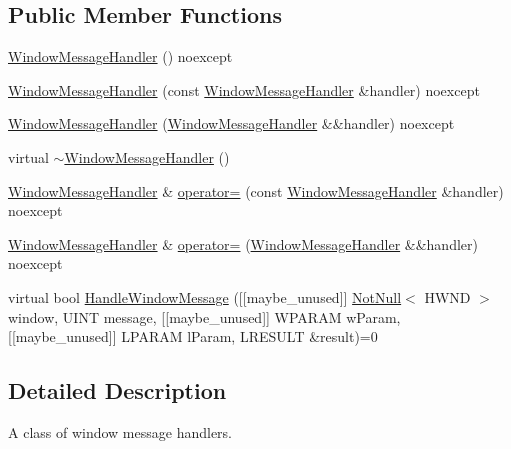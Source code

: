 \subsection*{Public Member Functions}
\begin{DoxyCompactItemize}
\item 
\hyperlink{classmage_1_1_window_message_handler_ae2213e3ff0a7c418ecfed87cfa43a8b7}{Window\+Message\+Handler} () noexcept
\item 
\hyperlink{classmage_1_1_window_message_handler_a2dd683eafde6c68efc55aebc8460fb0a}{Window\+Message\+Handler} (const \hyperlink{classmage_1_1_window_message_handler}{Window\+Message\+Handler} \&handler) noexcept
\item 
\hyperlink{classmage_1_1_window_message_handler_ab6fe3eac35ef7262941dae8e65841d88}{Window\+Message\+Handler} (\hyperlink{classmage_1_1_window_message_handler}{Window\+Message\+Handler} \&\&handler) noexcept
\item 
virtual \hyperlink{classmage_1_1_window_message_handler_a24eae1a24e783b22fce2c7fdd8e14fef}{$\sim$\+Window\+Message\+Handler} ()
\item 
\hyperlink{classmage_1_1_window_message_handler}{Window\+Message\+Handler} \& \hyperlink{classmage_1_1_window_message_handler_a6f48f6a94d62bee913e5f0fabc166cab}{operator=} (const \hyperlink{classmage_1_1_window_message_handler}{Window\+Message\+Handler} \&handler) noexcept
\item 
\hyperlink{classmage_1_1_window_message_handler}{Window\+Message\+Handler} \& \hyperlink{classmage_1_1_window_message_handler_acb05035c5d298e7a1db0e8e2c1fcb71d}{operator=} (\hyperlink{classmage_1_1_window_message_handler}{Window\+Message\+Handler} \&\&handler) noexcept
\item 
virtual bool \hyperlink{classmage_1_1_window_message_handler_a861750616c1517630e54a359d1234653}{Handle\+Window\+Message} (\mbox{[}\mbox{[}maybe\+\_\+unused\mbox{]}\mbox{]} \hyperlink{namespacemage_a8769f9d670d6b585ea306cb1062af94b}{Not\+Null}$<$ H\+W\+ND $>$ window, U\+I\+NT message, \mbox{[}\mbox{[}maybe\+\_\+unused\mbox{]}\mbox{]} W\+P\+A\+R\+AM w\+Param, \mbox{[}\mbox{[}maybe\+\_\+unused\mbox{]}\mbox{]} L\+P\+A\+R\+AM l\+Param, L\+R\+E\+S\+U\+LT \&result)=0
\end{DoxyCompactItemize}


\subsection{Detailed Description}
A class of window message handlers. 

